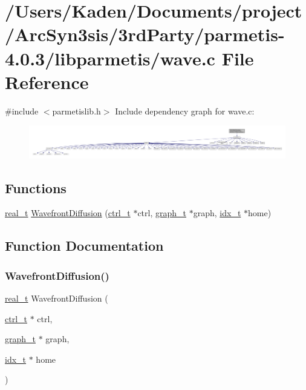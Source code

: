 \hypertarget{a00413}{}\section{/\+Users/\+Kaden/\+Documents/project/\+Arc\+Syn3sis/3rd\+Party/parmetis-\/4.0.3/libparmetis/wave.c File Reference}
\label{a00413}
{\ttfamily \#include $<$parmetislib.\+h$>$}\newline
Include dependency graph for wave.\+c\+:\nopagebreak
\begin{figure}[H]
\begin{center}
\leavevmode
\includegraphics[width=350pt]{a00414}
\end{center}
\end{figure}
\subsection*{Functions}
\begin{DoxyCompactItemize}
\item 
\hyperlink{a00876_a1924a4f6907cc3833213aba1f07fcbe9}{real\+\_\+t} \hyperlink{a00413_a82c7423dfb045f99c1ef26e9fd09976a}{Wavefront\+Diffusion} (\hyperlink{a00742}{ctrl\+\_\+t} $\ast$ctrl, \hyperlink{a00734}{graph\+\_\+t} $\ast$graph, \hyperlink{a00876_aaa5262be3e700770163401acb0150f52}{idx\+\_\+t} $\ast$home)
\end{DoxyCompactItemize}


\subsection{Function Documentation}
\mbox{\label{a00413_a82c7423dfb045f99c1ef26e9fd09976a}} 
\subsubsection{\texorpdfstring{Wavefront\+Diffusion()}{WavefrontDiffusion()}}
{\footnotesize\ttfamily \hyperlink{a00876_a1924a4f6907cc3833213aba1f07fcbe9}{real\+\_\+t} Wavefront\+Diffusion (\begin{DoxyParamCaption}\item[{\hyperlink{a00742}{ctrl\+\_\+t} $\ast$}]{ctrl,  }\item[{\hyperlink{a00734}{graph\+\_\+t} $\ast$}]{graph,  }\item[{\hyperlink{a00876_aaa5262be3e700770163401acb0150f52}{idx\+\_\+t} $\ast$}]{home }\end{DoxyParamCaption})}

